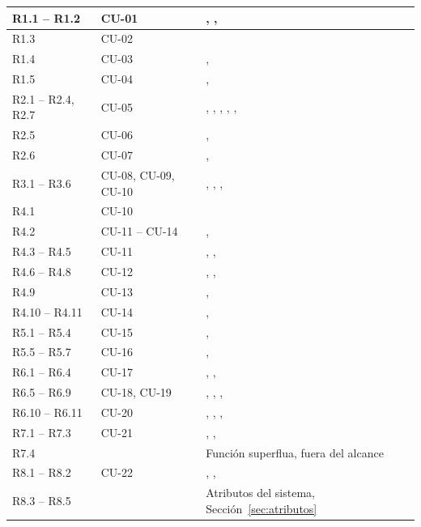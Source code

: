 {\begin{longtable}{L{0.16\textwidth} L{0.24\textwidth} L{0.54\textwidth}}
R1.1 -- R1.2 & CU-01 & , ,  \\
\midrule
R1.3 & CU-02 &  \\
\midrule
R1.4 & CU-03 & ,  \\
\midrule
R1.5 & CU-04 & ,  \\
\midrule
R2.1 -- R2.4, R2.7 & CU-05 &
, , ,
, ,  \\
\midrule
R2.5 & CU-06 & ,  \\
\midrule
R2.6 & CU-07 & ,  \\
\midrule
R3.1 -- R3.6 & CU-08, CU-09, CU-10 &
, , ,  \\
\midrule
R4.1 & CU-10 &  \\
\midrule
R4.2 & CU-11 -- CU-14 & ,  \\
\midrule
R4.3 -- R4.5 & CU-11 & , ,  \\
\midrule
R4.6 -- R4.8 & CU-12 & , ,  \\
\midrule
R4.9 & CU-13 & ,  \\
\midrule
R4.10 -- R4.11 & CU-14 & ,  \\
\midrule
R5.1 -- R5.4 & CU-15 & ,  \\
\midrule
R5.5 -- R5.7 & CU-16 & ,  \\
\midrule
R6.1 -- R6.4 & CU-17 & , ,  \\
\midrule
R6.5 -- R6.9 & CU-18, CU-19 &
, , ,  \\
\midrule
R6.10 -- R6.11 & CU-20 &
, , ,
 \\
\midrule
R7.1 -- R7.3 & CU-21 & , ,  \\
\midrule
R7.4 &  & Función superflua, fuera del alcance \\
\midrule
R8.1 -- R8.2 & CU-22 & , ,  \\
\midrule
R8.3 -- R8.5 &  &
Atributos del sistema, Sección~\ref{sec:atributos} \\

\bottomrule

\end{longtable}
}
